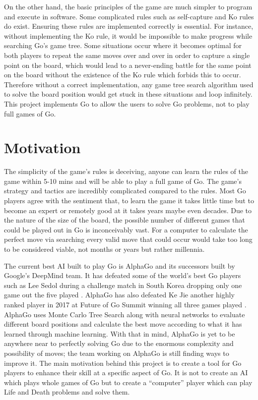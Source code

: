 \documentclass{l4proj}
\begin{document}
On the other hand, the basic principles of the game are much simpler to program and execute in software. Some complicated rules such as self-capture and Ko rules do exist. Ensuring these rules are implemented correctly is essential. For instance, without implementing the Ko rule, it would be impossible to make progress while searching Go’s game tree. Some situations occur where it becomes optimal for both players to repeat the same moves over and over in order to capture a single point on the board, which would lead to a never-ending battle for the same point on the board without the existence of the Ko rule which forbids this to occur. Therefore without a correct implementation, any game tree search algorithm used to solve the board position would get stuck in these situations and loop infinitely. This project implements Go to allow the users to solve Go problems, not to play full games of Go.

\section{Motivation}
The simplicity of the game's rules is deceiving, anyone can learn the rules of the game within 5-10 mins and will be able to play a full game of Go. The game's strategy and tactics are incredibly complicated compared to the rules. Most Go players agree with the sentiment that, to learn the game it takes little time but to become an expert or remotely good at it takes years maybe even decades. Due to the nature of the size of the board, the possible number of different games that could be played out in Go is inconceivably vast. For a computer to calculate the perfect move via searching every valid move that could occur would take too long to be considered viable, not months or years but rather millennia.

The current best AI built to play Go is AlphaGo \citep{AlphaGo} and its successors built by Google’s DeepMind team. It has defeated some of the world’s best Go players such as Lee Sedol during a challenge match in South Korea dropping only one game out the five played \citep{AlphaGoLeeSedol}. AlphaGo has also defeated Ke Jie another highly ranked player in 2017 at Future of Go Summit winning all three games played \citep{AlphaGoKeJie}. AlphaGo uses Monte Carlo Tree Search along with neural networks to evaluate different board positions and calculate the best move according to what it has learned through machine learning. With that in mind, AlphaGo is yet to be anywhere near to perfectly solving Go due to the enormous complexity and possibility of moves; the team working on AlphaGo is still finding ways to improve it.
The main motivation behind this project is to create a tool for Go players to enhance their skill at a specific aspect of Go. It is not to create an AI which plays whole games of Go but to create a “computer” player which can play Life and Death problems and solve them.
\end{document}
